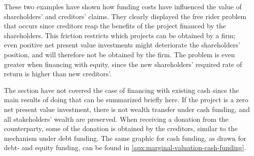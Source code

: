 \documentclass[main.tex]{subfiles}
\begin{document}
    These two examples have shown how funding costs have influenced 
    the value of shareholders' and creditors' claims.
    They clearly displayed the free rider problem that occurs
    since creditors reap the benefits of the project financed by the shareholders.
    This friction restricts which projects can be obtained by a firm;
    even positive net present value investments might deteriorate the shareholders' position,
    and will therefore not be obtained by the firm.
    The problem is even greater when financing with equity, 
    since the new shareholders' required rate of return is higher than new creditors'.
    
    The section have not covered the case of financing with existing cash
    since the main results of doing that can be summarized briefly here.
    If the project is a zero net present value investment, 
    there is not wealth transfer under cash funding,
    and all stakeholders' wealth are preserved.
    When receiving a donation from the counterparty, 
    some of the donation is obtained by the creditors, similar to the mechanism under debt funding.
    The same graphic for cash funding, as drawn for debt- and equity funding, can be found in 
    \cref{apx:marginal-valuation-cash-funding}.
\end{document}
